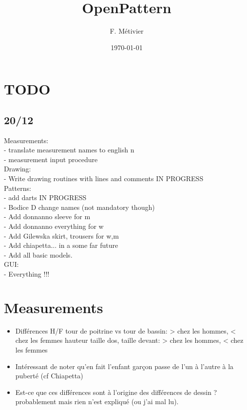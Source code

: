 \documentclass[11pt,a4paper]{article}
\begin{document}
\title{OpenPattern}
\author{F. Métivier}
\date{\today}

\section{TODO}

\subsection{20/12}


Measurements:\\
- translate measurement names to english n\\
- measurement input procedure\\

Drawing:\\
- Write drawing routines with lines and comments IN PROGRESS\\


Patterns:\\
- add darts IN PROGRESS\\
- Bodice D change names (not mandatory though)\\
- Add donnanno sleeve for m\\
- Add donnanno everything for w\\
- Add Gilewska skirt, trousers for w,m\\
- Add chiapetta... in a some far future\\
- Add all basic models.\\

GUI:\\
- Everything !!!\\


\section{Measurements}
\begin{itemize}

\item Différences H/F
\subitem tour de poitrine vs tour de bassin: > chez les hommes, < chez les femmes
\subitem hauteur taille dos, taille devant: > chez les hommes, < chez les femmes

\item Intéressant de noter qu'en fait l'enfant garçon passe de l'un à l'autre à la puberté (cf Chiapetta)

\item Est-ce que ces différences sont à l'origine des différences de dessin ? probablement mais rien n'est expliqué (ou j'ai mal lu).
\end{itemize}
\end{document}
